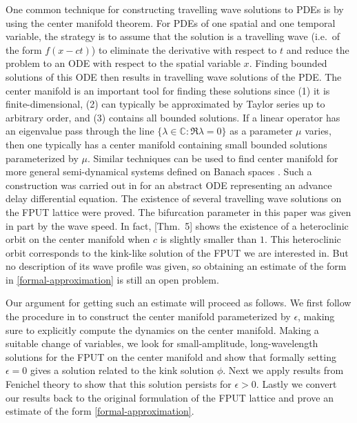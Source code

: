 One common technique for constructing travelling wave solutions to PDEs is by using the center manifold theorem. For PDEs of one spatial and one temporal variable, the strategy is to assume that the solution is a travelling wave (i.e.\ of the form \(f(x-ct)\)) to eliminate the derivative with respect to \(t\) and reduce the problem to an ODE with respect to the spatial variable \(x\). Finding bounded solutions of this ODE then results in travelling wave solutions of the PDE. The center manifold is an important tool for finding these solutions since (1) it is finite-dimensional, (2) can typically be approximated by Taylor series up to arbitrary order, and (3) contains all bounded solutions. If a linear operator has an eigenvalue pass through the line \(\{\lambda\in\mathbb C: \Re \lambda = 0\}\) as a parameter \(\mu\) varies, then one typically has a center manifold containing small bounded solutions parameterized by \(\mu\). Similar techniques can be used to find center manifold for more general semi-dynamical systems defined on Banach spaces \cite{vanderbauwhede1992center}. Such a construction was carried out in \cite{iooss2000travelling} for an abstract ODE representing an advance delay differential equation. The existence of several travelling wave solutions on the FPUT lattice were proved. The bifurcation parameter in this paper was given in part by the wave speed. In fact, [Thm.\ 5]\cite{iooss2000travelling} shows the existence of a heteroclinic orbit on the center manifold when \(c\) is slightly smaller than \(1\). This heteroclinic orbit corresponds to the kink-like solution of the FPUT we are interested in. But no description of its wave profile was given, so obtaining an estimate of the form in \cref{formal-approximation} is still an open problem.


Our argument for getting such an estimate will proceed as follows. We first follow the procedure in \cite{iooss2000travelling}
to construct the center manifold parameterized by \(\epsilon\), making sure to explicitly compute the dynamics on the center manifold. Making a suitable change of variables, we look for small-amplitude, long-wavelength solutions for the FPUT on the center manifold and show that formally setting \(\epsilon = 0\) gives a solution related to the kink solution \(\phi\). Next we apply results from Fenichel theory to show that this solution persists for \(\epsilon> 0\). Lastly we convert our results back to the original formulation of the FPUT lattice and prove an estimate of the form \cref{formal-approximation}.

